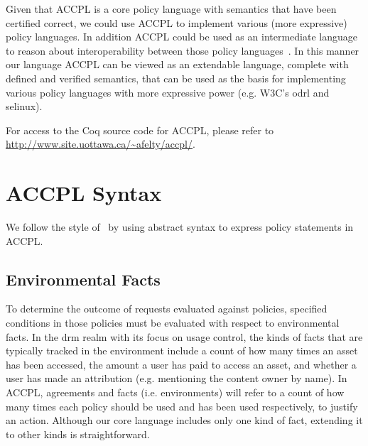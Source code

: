 \documentclass[runningheads,a4paper]{llncs}
\begin{document}
Given that \ac{ACCPL} is a core policy language with semantics that have been certified correct, we could use \ac{ACCPL} to implement various (more expressive) policy languages. In addition \ac{ACCPL} could be used as an intermediate language to reason about interoperability between those policy languages~\cite{prados2005interoperability,maronas2009architecture}. In this manner our language \ac{ACCPL} can be viewed as an extendable language, complete with defined and verified semantics, that can be used as the basis for implementing various policy languages with more expressive power (e.g. W3C's \ac{odrl} and \ac{selinux}). 

For access to the Coq source code for \ac{ACCPL}, please refer to \url{http://www.site.uottawa.ca/~afelty/accpl/}.

\section{ACCPL Syntax}

We follow the style of~\cite{pucella2006} by using abstract syntax to express policy statements in \ac{ACCPL}. 

\subsection{Environmental Facts}\label{sec:odrl0}
To determine the outcome of requests evaluated against policies,
specified conditions in those policies must be evaluated with respect
to environmental facts. In the \ac{drm} realm with its focus on usage
control, the kinds of facts that are typically tracked in the
environment include a count of how many times an asset has been
accessed, the amount a user has paid to access an asset, and whether a
user has made an attribution (e.g. mentioning the content owner by
name). In \ac{ACCPL}, agreements and facts (i.e. environments) will
refer to a count of how many times each policy should be used and has
been used respectively, to justify an action.
Although our core language includes only one kind of fact, extending
it to other kinds is straightforward.
\end{document}
